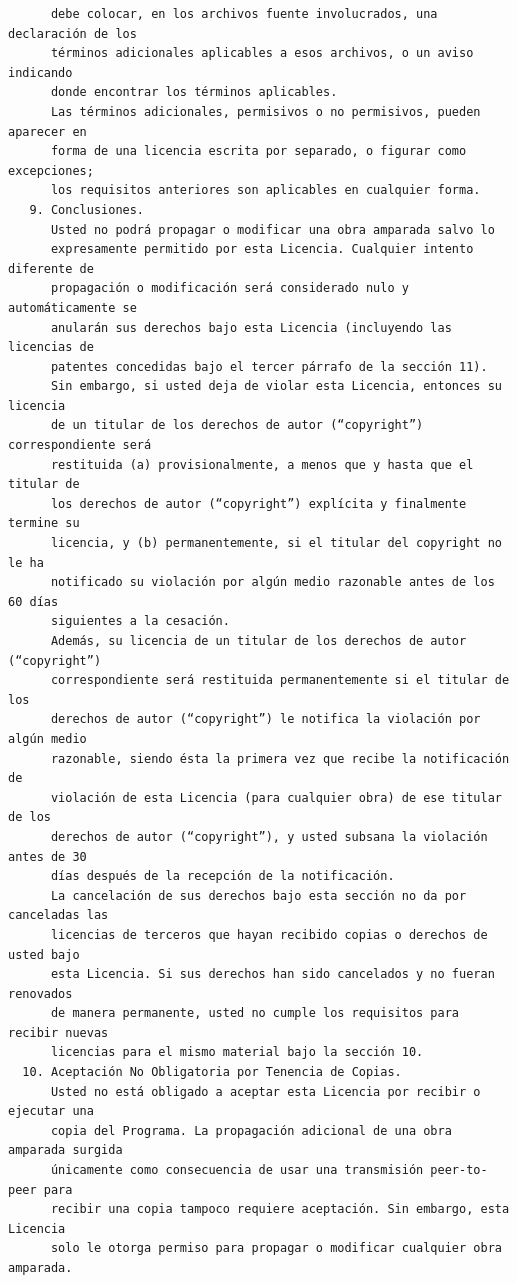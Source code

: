 \begin{verbatim}
      debe colocar, en los archivos fuente involucrados, una declaración de los
      términos adicionales aplicables a esos archivos, o un aviso indicando
      donde encontrar los términos aplicables.
      Las términos adicionales, permisivos o no permisivos, pueden aparecer en
      forma de una licencia escrita por separado, o figurar como excepciones;
      los requisitos anteriores son aplicables en cualquier forma.
   9. Conclusiones.
      Usted no podrá propagar o modificar una obra amparada salvo lo
      expresamente permitido por esta Licencia. Cualquier intento diferente de
      propagación o modificación será considerado nulo y automáticamente se
      anularán sus derechos bajo esta Licencia (incluyendo las licencias de
      patentes concedidas bajo el tercer párrafo de la sección 11).
      Sin embargo, si usted deja de violar esta Licencia, entonces su licencia
      de un titular de los derechos de autor (“copyright”) correspondiente será
      restituida (a) provisionalmente, a menos que y hasta que el titular de
      los derechos de autor (“copyright”) explícita y finalmente termine su
      licencia, y (b) permanentemente, si el titular del copyright no le ha
      notificado su violación por algún medio razonable antes de los 60 días
      siguientes a la cesación.
      Además, su licencia de un titular de los derechos de autor (“copyright”)
      correspondiente será restituida permanentemente si el titular de los
      derechos de autor (“copyright”) le notifica la violación por algún medio
      razonable, siendo ésta la primera vez que recibe la notificación de
      violación de esta Licencia (para cualquier obra) de ese titular de los
      derechos de autor (“copyright”), y usted subsana la violación antes de 30
      días después de la recepción de la notificación.
      La cancelación de sus derechos bajo esta sección no da por canceladas las
      licencias de terceros que hayan recibido copias o derechos de usted bajo
      esta Licencia. Si sus derechos han sido cancelados y no fueran renovados
      de manera permanente, usted no cumple los requisitos para recibir nuevas
      licencias para el mismo material bajo la sección 10.
  10. Aceptación No Obligatoria por Tenencia de Copias.
      Usted no está obligado a aceptar esta Licencia por recibir o ejecutar una
      copia del Programa. La propagación adicional de una obra amparada surgida
      únicamente como consecuencia de usar una transmisión peer-to-peer para
      recibir una copia tampoco requiere aceptación. Sin embargo, esta Licencia
      solo le otorga permiso para propagar o modificar cualquier obra amparada.

\end{verbatim}
